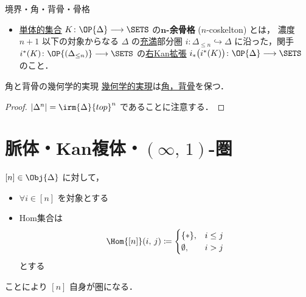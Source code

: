 \documentclass[TQFT_main]{subfiles}
\begin{document}
\begin{mydef}[label=def:horn,breakable]{境界・角・背骨・骨格}
\begin{itemize}
        \item \hyperref[def:SimpSet]{単体的集合} $K \colon \OP{\Delta} \lto \SETS$ の\textbf{$\bm{n}$-余骨格} ($n$-coskelton) とは，
        濃度 $n+1$ 以下の対象からなる $\Delta$ の\hyperref[def:faithful]{充満}部分圏 $i \colon \Delta_{\le n} \hookrightarrow \Delta$ に沿った，関手 $i^*(K) \colon \OP{(\Delta_{\le n})} \lto \SETS$ の\hyperref[def:Kanext]{右Kan拡張} $i_* \bigl(i^* (K)\bigr) \colon \OP{\Delta} \lto \SETS$ のこと．
    \end{itemize}
    
\end{mydef}

\begin{myprop}[label=prop:horn-spine-basic]{角と背骨の幾何学的実現}
    \hyperref[def:geometric-realization]{幾何学的実現}は\hyperref[def:horn]{角，背骨}を保つ．
\end{myprop}

\begin{proof}
    $\abs{\Delta^n} = \irm{\Delta}{top}^n$ であることに注意する．
\end{proof}

\section{脈体・Kan複体・$(\infty,\, 1)$-圏}

$[n] \in \Obj{\Delta}$ に対して，
\begin{itemize}
    \item $\forall i \in [n]$ を対象とする
    \item Hom集合は
    \begin{align}
        \Hom{[n]} (i,\, j)
        \coloneqq
        \begin{cases}
            \{*\}, &i \le j \\
            \emptyset, &i > j
        \end{cases}
    \end{align}
    とする
\end{itemize}
ことにより $[n]$ 自身が圏になる．
\end{document}
